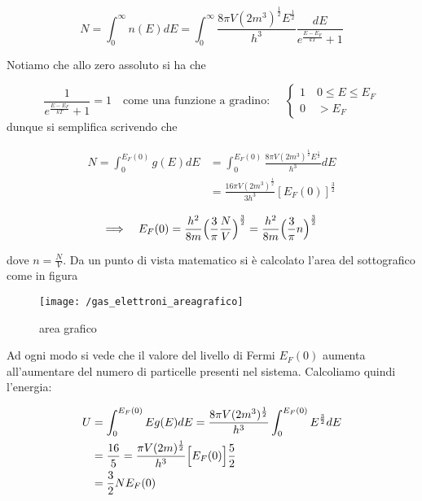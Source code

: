 \newpage

\begin{equation}
N = \int_0^{\infty} n(E)dE = \int_0^{\infty} \frac{8 \pi V (2m^3)^{\frac{1}{2}} E^{\frac{1}{2}}}{h^3} \frac{ dE}{e^{ \frac{ E-E_F}{kT } } + 1 }
\end{equation}

Notiamo che allo zero assoluto si ha che 

\begin{equation}
\frac{ 1 }{e^{ \frac{ E - E_F}{kT } } + 1 } = 1 \quad
\mbox{come una funzione a gradino: } \quad
\begin{cases}
	1 \quad 0 \le E \le E_F \\
	0 \quad > E_F
\end{cases}
\end{equation}
dunque si semplifica scrivendo che 

\begin{equation}
\begin{split}
N = \int_0^{E_F(0)} g(E)dE & =  \int_0^{E_F(0)} \frac{8 \pi V (2m^3)^{\frac{1}{2}} E^{\frac{1}{2}}}{h^3} dE \\
& = \frac{16 \pi V (2m^3)^{\frac{1}{2}} }{3 h^3} [E_F(0)]^{\frac{3}{2}}
\end{split}
\end{equation}

\begin{equation}
\Longrightarrow \quad E_F(0) = \frac{ h^2}{8m } \Bigl(  \frac{ 3}{\pi } \frac{ N}{V }  \Bigr)^{ \frac{ 3}{ 2} } = \frac{ h^2}{8m } \Bigl(  \frac{ 3}{\pi } n \Bigr)^{ \frac{ 3}{ 2} }
\end{equation}

dove $n = \frac{ N}{V }$.
Da un punto di vista matematico si è calcolato l'area del sottografico come in figura

\begin{figure}[h]
\centering
\texttt{[image: /gas\_elettroni\_areagrafico]}
\caption{area grafico}
\end{figure}

Ad ogni modo si vede che il valore del livello di Fermi $E_F(0)$ aumenta all'aumentare del numero di particelle presenti nel sistema.
Calcoliamo quindi l'energia:

\begin{equation}
\begin{split}
U & = \int_0^{E_F(0)} E g(E)dE = \frac{8 \pi V (2m^3)^{\frac{1}{2}} }{h^3} \int_0^{E_F(0)} E^{ \frac{ 3}{2 } } dE \\
& = \frac{ 16}{5 } = \frac{ \pi V (2m)^{ \frac{ 1}{2 } }}{h^{ 3 } } \Bigl[ E_F(0) \Bigr]\frac{ 5}{2} \\
& = \frac{ 3}{2} N E_F(0)
\end{split}
\end{equation}


